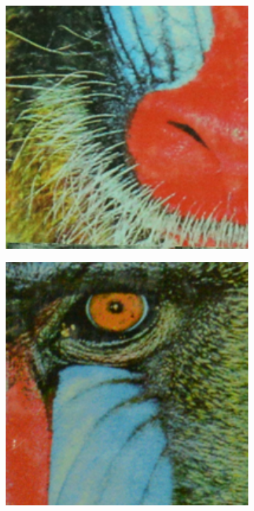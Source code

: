 \begin{figure}
\begin{subfigure}[t]{0.19\textwidth}
    \end{subfigure}
    \hfill
    \begin{subfigure}[t]{0.19\textwidth}
        \centering
        \includegraphics[width=1\textwidth]{images/mcwnnm/resize_5dmark3_iso3200_3_real.png}
    \end{subfigure}
    \hfill
    \begin{subfigure}[t]{0.19\textwidth}
        \centering
        \includegraphics[width=1\textwidth]{images/mcwnnm/resize_d600_iso3200_1_real.png}

\end{subfigure}
\end{figure}
